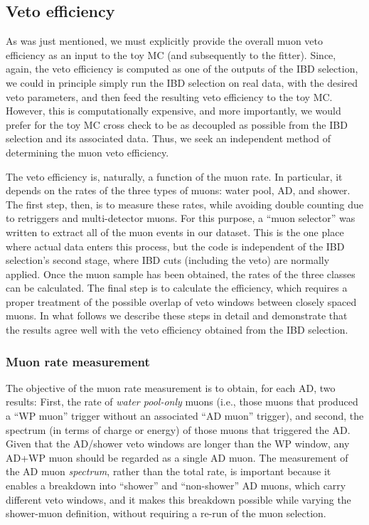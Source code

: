 \documentclass[../thesis.tex]{subfiles}
\begin{document}
\subsection{Veto efficiency}%
\label{sec:cutVaryMuVetoEff}

As was just mentioned, we must explicitly provide the overall muon veto efficiency as an input to the toy MC (and subsequently to the fitter). Since, again, the veto efficiency is computed as one of the outputs of the IBD selection, we could in principle simply run the IBD selection on real data, with the desired veto parameters, and then feed the resulting veto efficiency to the toy MC. However, this is computationally expensive, and more importantly, we would prefer for the toy MC cross check to be as decoupled as possible from the IBD selection and its associated data. Thus, we seek an independent method of determining the muon veto efficiency.

The veto efficiency is, naturally, a function of the muon rate. In particular, it depends on the rates of the three types of muons: water pool, AD, and shower. The first step, then, is to measure these rates, while avoiding double counting due to retriggers and multi-detector muons. For this purpose, a ``muon selector'' was written to extract all of the muon events in our dataset. This is the one place where actual data enters this process, but the code is independent of the IBD selection's second stage, where IBD cuts (including the veto) are normally applied. Once the muon sample has been obtained, the rates of the three classes can be calculated. The final step is to calculate the efficiency, which requires a proper treatment of the possible overlap of veto windows between closely spaced muons. In what follows we describe these steps in detail and demonstrate that the results agree well with the veto efficiency obtained from the IBD selection.

\subsubsection{Muon rate measurement}%
\label{sec:cutVaryMuRate}

The objective of the muon rate measurement is to obtain, for each AD, two results: First, the rate of \emph{water pool-only} muons (i.e., those muons that produced a ``WP muon'' trigger without an associated ``AD muon'' trigger), and second, the spectrum (in terms of charge or energy) of those muons that triggered the AD\@. Given that the AD/shower veto windows are longer than the WP window, any AD+WP muon should be regarded as a single AD muon. The measurement of the AD muon \emph{spectrum}, rather than the total rate, is important because it enables a breakdown into ``shower'' and ``non-shower'' AD muons, which carry different veto windows, and it makes this breakdown possible while varying the shower-muon definition, without requiring a re-run of the muon selection.
\end{document}
